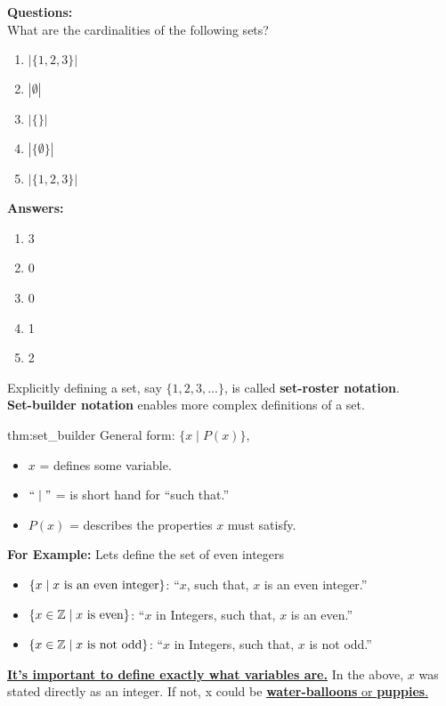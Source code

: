 \noindent
\textbf{Questions:}\\
What are the cardinalities of the following sets?
\begin{enumerate}
    \item $|\{1,2,3\}|$
    \item $|\emptyset|$
    \item $|\{\}|$
    \item $|\{\emptyset\}|$
    \item $|\{1,{2,3}\}|$
\end{enumerate}

\textbf{Answers:}
\begin{enumerate}
    \item 3
    \item 0
    \item 0
    \item 1
    \item 2
\end{enumerate}

\newpage

\noindent
Explicitly defining a set, say $\{1, 2, 3, ...\}$, is called \textbf{set-roster notation}.\\
\textbf{Set-builder notation} enables more complex definitions of a set.

\begin{theo}{thm:set_builder}
    General form: $\{x \mid P(x)\}$,
    \begin{itemize}
        \item $x$ = defines some variable.
        \item $``\mid"$ = is short hand for ``such that.''
        \item $P(x)$ = describes the properties $x$ must satisfy.
    \end{itemize}
\end{theo}

\noindent
\textbf{For Example:} Lets define the set of even integers\\
\vspace{-1em}
\begin{itemize}
    \item $\{x \mid x \textnormal{ is an even integer}\}$: ``$x$, such that, $x$ is an even integer.''
    \item $\{x \in \mathbb{Z} \mid x \textnormal{ is even}\}$: ``$x$ in Integers, such that, $x$ is an even.''
    \item $\{x \in \mathbb{Z} \mid x \textnormal{ is not odd}\}$: ``$x$ in Integers, such that, $x$ is not odd.''
\end{itemize}

\noindent
\underline{\textbf{It's important to define exactly what variables are.}}
In the above, $x$ was stated directly as an integer. If not, x could be \underline{\textbf{water-balloons} or \textbf{puppies}.}
